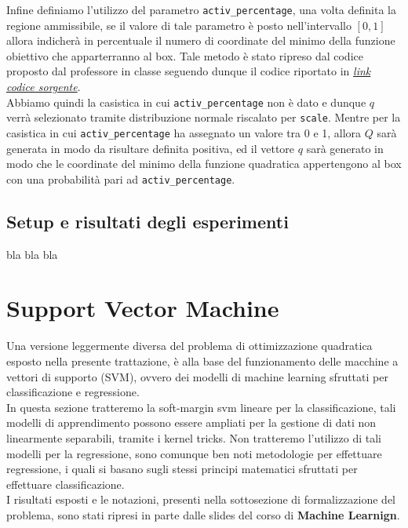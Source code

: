 \documentclass{article}
\begin{document}
Infine definiamo l'utilizzo del parametro \texttt{activ\_percentage}, una volta definita la regione ammissibile, se il valore di tale parametro è posto nell'intervallo $[0, 1]$ allora indicherà in percentuale il numero di coordinate del minimo della funzione obiettivo che apparterranno al box. Tale metodo è stato ripreso dal codice proposto dal professore in classe seguendo dunque il codice riportato in \href{https://elearning.di.unipi.it/pluginfile.php/47170/mod_resource/content/2/genBCQP.m}{\textit{link codice sorgente}}.\\
Abbiamo quindi la casistica in cui \texttt{activ\_percentage} non è dato e dunque $q$ verrà selezionato tramite distribuzione normale riscalato per \texttt{scale}.
Mentre per la casistica in cui \texttt{activ\_percentage} ha assegnato un valore tra 0 e 1, allora $Q$ sarà generata in modo da risultare definita positiva, ed il vettore $q$ sarà generato in modo che le coordinate del minimo della funzione quadratica appertengono al box con una probabilità pari ad \texttt{activ\_percentage}.
\subsection{Setup e risultati degli esperimenti}
bla bla bla
\section{Support Vector Machine}
Una versione leggermente diversa del problema di ottimizzazione quadratica esposto nella presente trattazione, è alla base del funzionamento delle macchine a vettori di supporto (SVM), ovvero dei modelli di machine learning sfruttati per classificazione e regressione.\\
In questa sezione tratteremo la soft-margin svm lineare per la classificazione, tali modelli di apprendimento possono essere ampliati per la gestione di dati non linearmente separabili, tramite i kernel tricks.
Non tratteremo l'utilizzo di tali modelli per la regressione, sono comunque ben noti metodologie per effettuare regressione, i quali si basano sugli stessi principi matematici sfruttati per effettuare classificazione.\\
I risultati esposti e le notazioni, presenti nella sottosezione di formalizzazione del problema, sono stati ripresi in parte dalle slides del corso di \textbf{Machine Learnign}.
\end{document}
